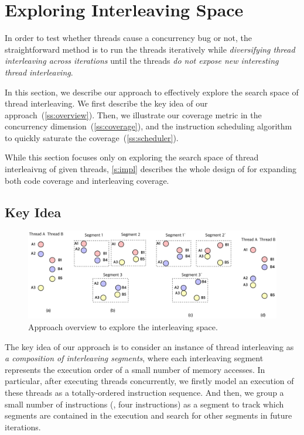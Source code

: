 \section{Exploring Interleaving Space}
\label{s:design}

In order to test whether threads cause a concurrency bug or not, the
straightforward method is to run the threads iteratively while
\textit{diversifying thread interleaving across iterations} until the
threads \textit{do not expose new interesting thread interleaving}.


In this section, we describe our approach to effectively explore the
search space of thread interleaving.
%
We first describe the key idea of our
approach~(\autoref{ss:overview}). Then, we illustrate our coverage
metric in the concurrency dimension~(\autoref{ss:coverage}), and the
instruction scheduling algorithm to quickly saturate the
coverage~(\autoref{ss:scheduler}).



While this section focuses only on exploring the search space of
thread interleaivng of given threads, \autoref{s:impl} describes the
whole design of \sys for expanding both code coverage and interleaving
coverage.


\subsection{Key Idea}
\label{ss:overview}

\begin{figure}[t]
  \includegraphics[width=0.9\linewidth]{fig/intuition.pdf}
  \caption{Approach overview to explore the interleaving
    space.}
  \label{fig:keyidea}
\end{figure}
%
The key idea of our approach is to consider an instance of thread
interleaving as \textit{a composition of interleaving segments}, where
each interleaving segment represents the execution order of a small
number of memory accesses.
%
In particular, after executing threads concurrently, we firstly model
an execution of these threads as a totally-ordered instruction
sequence.
%
And then, we group a small number of instructions (\eg, four
instructions) as a segment to track which segments are contained in
the execution and search for other segments in future iterations.


